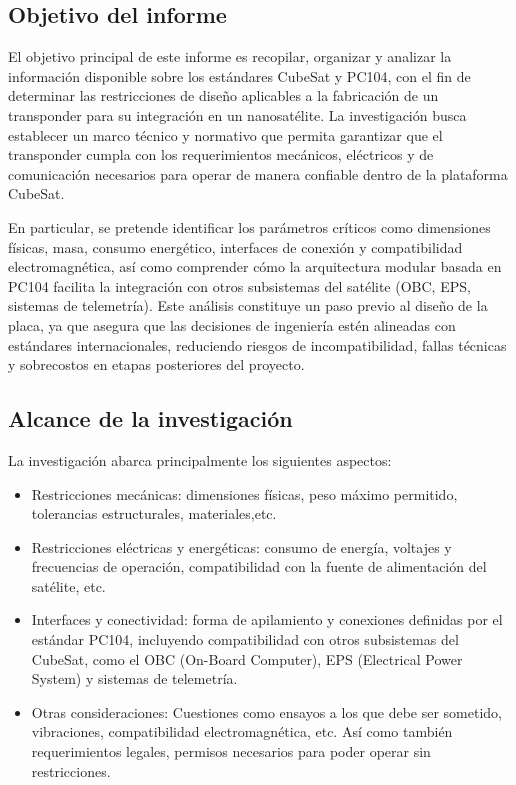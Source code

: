 \documentclass[12pt]{article}
\begin{document}
		\subsection{Objetivo del informe}
		El objetivo principal de este informe es recopilar, organizar y analizar la información disponible sobre los estándares CubeSat y PC104, con el fin de determinar las restricciones de diseño aplicables a la fabricación de un transponder para su integración en un nanosatélite. La investigación busca establecer un marco técnico y normativo que permita garantizar que el transponder cumpla con los requerimientos mecánicos, eléctricos y de comunicación necesarios para operar de manera confiable dentro de la plataforma CubeSat.
		
		En particular, se pretende identificar los parámetros críticos como dimensiones físicas, masa, consumo energético, interfaces de conexión y compatibilidad electromagnética, así como comprender cómo la arquitectura modular basada en PC104 facilita la integración con otros subsistemas del satélite (OBC, EPS, sistemas de telemetría). Este análisis constituye un paso previo al diseño de la placa, ya que asegura que las decisiones de ingeniería estén alineadas con estándares internacionales, reduciendo riesgos de incompatibilidad, fallas técnicas y sobrecostos en etapas posteriores del proyecto.
		
		\subsection{Alcance de la investigación}
		La investigación abarca principalmente los siguientes aspectos:
		\begin{itemize}
			\item Restricciones mecánicas: dimensiones físicas, peso máximo permitido, tolerancias estructurales, materiales,etc.
			\item Restricciones eléctricas y energéticas: consumo de energía, voltajes  y frecuencias de operación, compatibilidad con la fuente de alimentación del satélite, etc.
			\item Interfaces y conectividad: forma de apilamiento y conexiones definidas por el estándar PC104, incluyendo compatibilidad con otros subsistemas del CubeSat, como el OBC (On-Board Computer), EPS (Electrical Power System) y sistemas de telemetría.
			\item Otras consideraciones: Cuestiones como ensayos a los que debe ser sometido, vibraciones, compatibilidad electromagnética, etc. Así como también requerimientos legales, permisos necesarios para poder operar sin restricciones.
		\end{itemize}
		
\end{document}
